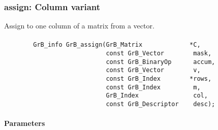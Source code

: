 \subsubsection{{\sf assign}: Column variant}

Assign to one column of a matrix from a vector.  

\paragraph{\syntax}

\begin{verbatim}
        GrB_info GrB_assign(GrB_Matrix             *C,
                            const GrB_Vector        mask,
                            const GrB_BinaryOp      accum,
                            const GrB_Vector        v,
                            const GrB_Index        *rows,
                            const GrB_Index         m,
                            GrB_Index               col,
                            const GrB_Descriptor    desc); 
\end{verbatim}

\paragraph{Parameters}

